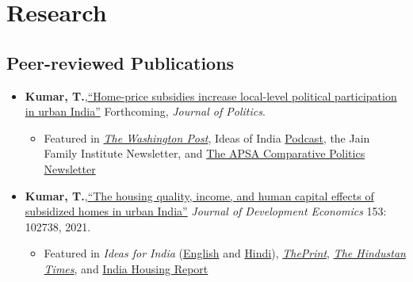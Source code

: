 \documentclass[11pt]{article}
\begin{document}
	
\vspace{2mm}
\color{MidnightBlue}

\section*{Research}
\color{Black}


\subsection*{Peer-reviewed Publications}
\begin{itemize}
	



			\item[] \textbf{Kumar, T.},\href{https://doi.org/10.1086/715605}{``Home-price subsidies increase local-level political participation in urban India''} Forthcoming, \textit{Journal of Politics}.
			\begin{itemize}[nosep]
			\item Featured in \href{https://www.washingtonpost.com/news/monkey-cage/wp/2019/01/31/heres-what-gavin-newsom-elizabeth-warren-and-microsoft-should-know-if-want-to-end-the-affordable-housing-crisis/?tid=sm_tw_cage}{\textit{The Washington Post}},  Ideas of India \href{https://www.discoursemagazine.com/politics/2020/12/24/ideas-of-india-how-does-subsidizing-housing-prices-shape-political-behavior}{Podcast},  the Jain Family Institute Newsletter, and \href{https://www.comparativepoliticsnewsletter.org/wp-content/uploads/2020/05/Spring-Newsletter-2020.pdf}{The APSA Comparative Politics Newsletter} 			\end{itemize}
			\item[]\textbf{Kumar, T.},\href{https://doi.org/10.1016/j.jdeveco.2021.102738}{``The housing quality, income, and human capital effects of subsidized homes in urban India''} \textit{Journal of Development Economics} 153: 102738, 2021.
\begin{itemize}
	\item Featured in \textit{Ideas for India} (\href{https://www.ideasforindia.in/topics/poverty-inequality/household-level-effects-of-affordable-housing-evidence-from-mumbai.html}{English} and \href{https://www.ideasforindia.in/topics/poverty-inequality/household-level-effects-of-affordable-housing-evidence-from-mumbai-hindi.html}{Hindi}), \href{https://theprint.in/opinion/mumbai-residents-win-govt-housing-lottery-and-spend-more-on-kids-education-jobs-study/290485/}{\textit{ThePrint}}, \href{https://www.hindustantimes.com/opinion/housing-is-a-welfare-weapon-it-can-help-people-escape-poverty-101629993983576.html}{\textit{The Hindustan Times}}, and \href{https://indiahousingreport.in/outputs/opinion/housing-is-a-welfare-weapon-it-can-help-people-escape-poverty/}{India Housing Report}


\end{itemize}
\end{itemize}
\end{document}

